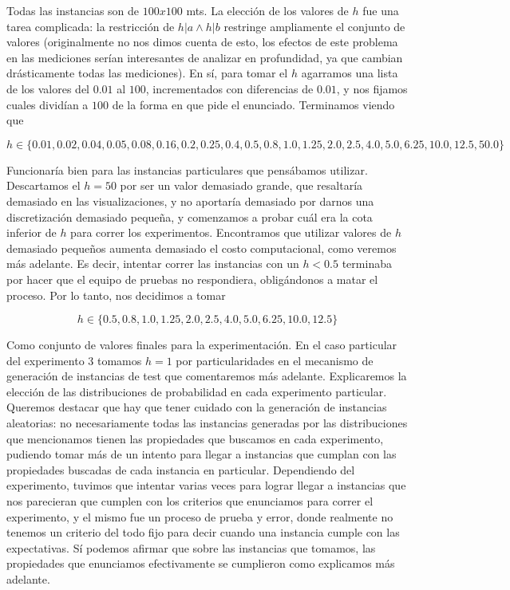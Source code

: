Todas las instancias son de $100x100$ mts. La elección de los valores de $h$ fue una tarea complicada: la restricción de $h | a \wedge h | b$ restringe ampliamente el conjunto de valores (originalmente no nos dimos cuenta de esto, los efectos de este problema en las mediciones serían interesantes de analizar en profundidad, ya que cambian drásticamente todas las mediciones). En sí, para tomar el $h$ agarramos una lista de los valores del $0.01$ al $100$, incrementados con diferencias de $0.01$, y nos fijamos cuales dividían a $100$ de la forma en que pide el enunciado. Terminamos viendo que

$$h \in \{0.01, 0.02, 0.04, 0.05, 0.08, 0.16, 0.2, 0.25, 0.4, 0.5, 0.8, 1.0, 1.25, 2.0, 2.5, 4.0, 5.0, 6.25, 10.0, 12.5, 50.0\}$$

Funcionaría bien para las instancias particulares que pensábamos utilizar. Descartamos el $h = 50$ por ser un valor demasiado grande, que resaltaría demasiado en las visualizaciones, y no aportaría demasiado por darnos una discretización demasiado pequeña, y comenzamos a probar cuál era la cota inferior de $h$ para correr los experimentos. Encontramos que utilizar valores de $h$ demasiado pequeños aumenta demasiado el costo computacional, como veremos más adelante. Es decir, intentar correr las instancias con un $h < 0.5$ terminaba por hacer que el equipo de pruebas no respondiera, obligándonos a matar el proceso. Por lo tanto, nos decidimos a tomar

$$h \in \{0.5, 0.8, 1.0, 1.25, 2.0, 2.5, 4.0, 5.0, 6.25, 10.0, 12.5\}$$

Como conjunto de valores finales para la experimentación. En el caso particular del experimento 3 tomamos $h = 1$ por particularidades en el mecanismo de generación de instancias de test que comentaremos más adelante. Explicaremos la elección de las distribuciones de probabilidad en cada experimento particular. Queremos destacar que hay que tener cuidado con la generación de instancias aleatorias: no necesariamente todas las instancias generadas por las distribuciones que mencionamos tienen las propiedades que buscamos en cada experimento, pudiendo tomar más de un intento para llegar a instancias que cumplan con las propiedades buscadas de cada instancia en particular. Dependiendo del experimento, tuvimos que intentar varias veces para lograr llegar a instancias que nos parecieran que cumplen con los criterios que enunciamos para correr el experimento, y el mismo fue un proceso de prueba y error, donde realmente no tenemos un criterio del todo fijo para decir cuando una instancia cumple con las expectativas. Sí podemos afirmar que sobre las instancias que tomamos, las propiedades que enunciamos efectivamente se cumplieron como explicamos más adelante.

